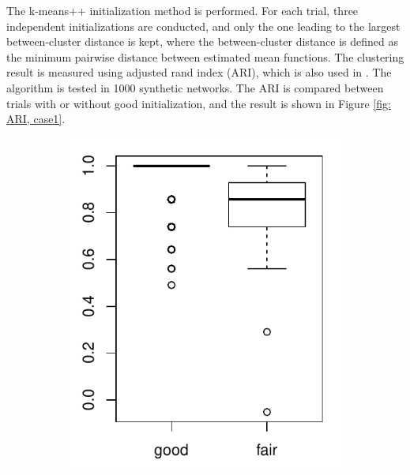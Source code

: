 \noindent
The k-means++ initialization method is performed. 
For each trial, three independent initializations are conducted, and only the one leading to the largest 
between-cluster distance
is kept, where the between-cluster distance is defined as the minimum pairwise distance between estimated mean  functions.
The clustering result is measured using adjusted rand index (ARI), which is also used in \citet{Matias2018}.
The algorithm is tested in 1000 synthetic networks. 
The ARI is compared between trials with or without good initialization, and the result is shown in Figure \ref{fig: ARI, case1}.


\begin{figure}
\begin{subfigure}{.45\textwidth}
\includegraphics[width=\linewidth]{../simulation/plots/ARI_vs_init_case1.pdf}
\caption{}
\label{fig: ARI boxplot, case 1}
\end{subfigure}

\end{figure}
